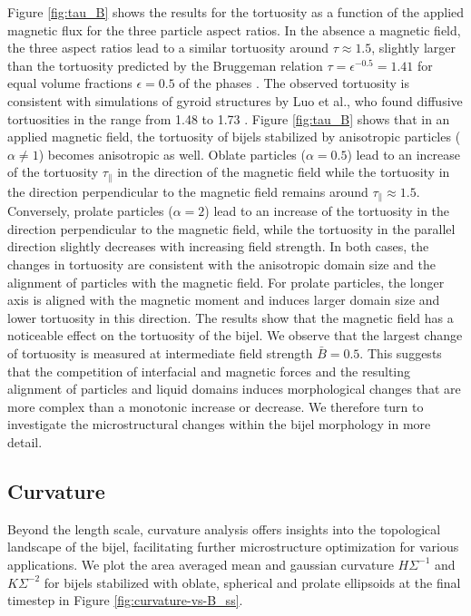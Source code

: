 Figure \ref{fig:tau_B} shows the results for the tortuosity as a
function of the applied magnetic flux for the three particle aspect
ratios. In the absence a magnetic field, the three aspect ratios lead to
a similar tortuosity around $\tau\approx 1.5$, slightly larger than
the tortuosity predicted by the Bruggeman relation
\(\tau=\epsilon^{-0.5}=1.41\) for equal volume fractions
\(\epsilon=0.5\) of the phases
\cite{bruggeman1935tortuosity, tjaden_origin_2016}. The observed
tortuosity is consistent with simulations of gyroid structures by Luo et
al., who found diffusive tortuosities in the range from 1.48 to 1.73
\cite{luo_macroscopic_2020}. Figure \ref{fig:tau_B} shows that in an
applied magnetic field, the tortuosity of bijels stabilized by
anisotropic particles (\(\alpha\neq1\)) becomes anisotropic as well.
Oblate particles (\(\alpha=0.5\)) lead to an increase of the tortuosity
\(\tau_\parallel\) in the direction of the magnetic field while the
tortuosity in the direction perpendicular to the magnetic field remains
around \(\tau_\parallel\approx1.5\). Conversely, prolate particles
(\(\alpha=2\)) lead to an increase of the tortuosity in the direction
perpendicular to the magnetic field, while the tortuosity in the
parallel direction slightly decreases with increasing field strength. In
both cases, the changes in tortuosity are consistent with the
anisotropic domain size and the alignment of particles with the magnetic
field. For prolate particles, the longer axis is aligned with the
magnetic moment and induces larger domain size and lower tortuosity in
this direction. The results show that the magnetic field has a
noticeable effect on the tortuosity of the bijel. We observe that the
largest change of tortuosity is measured at intermediate field strength
\(\bar{B}=0.5\). This suggests that the competition of interfacial and
magnetic forces and the resulting alignment of particles and liquid
domains induces morphological changes that are more complex than a
monotonic increase or decrease. We therefore turn to investigate the
microstructural changes within the bijel morphology in more detail.

\subsection{Curvature}

Beyond the length scale, curvature analysis offers insights into the
topological landscape of the bijel, facilitating further
microstructure optimization for various applications.
\cite{reeves_quantitative_2016} We plot the area averaged mean and
gaussian curvature \(H\Sigma^{-1}\) and \(K\Sigma^{-2}\) for bijels
stabilized with oblate, spherical and prolate ellipsoids at the final timestep in Figure
\ref{fig:curvature-vs-B_ss}. 

